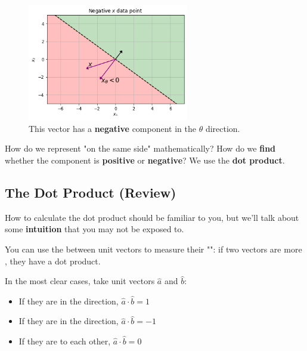         \begin{figure}[H]
            \centering
                \includegraphics[width=70mm,scale=0.5]{images/classification_images/negative_v_vector.png}
                
                \caption*{This vector has a \textbf{negative} component in the $\theta$ direction.}
        \end{figure}
            
        How do we represent "on the same side" mathematically? How do we \textbf{find} whether the component is \textbf{positive} or \textbf{negative}? We use the \textbf{dot product}.\\
        
    \subsection{The Dot Product (Review)}
    
        How to calculate the dot product should be familiar to you, but we'll talk about some \textbf{intuition} that you may not be exposed to.\\
        
        \begin{concept}
            You can use the  between unit vectors to measure their "": if two vectors are more , they have a  dot product.
            
            In the most clear cases, take unit vectors $\hat{a}$ and $\hat{b}$:
            
            \begin{itemize} 
                \item If they are in the  direction, $\hat{a} \cdot \hat{b} = 1$
                
                \item If they are in the  direction, $\hat{a} \cdot \hat{b} = -1$
                
                \item If they are  to each other, $\hat{a} \cdot \hat{b} = 0$
            \end{itemize}
        \end{concept}
        
